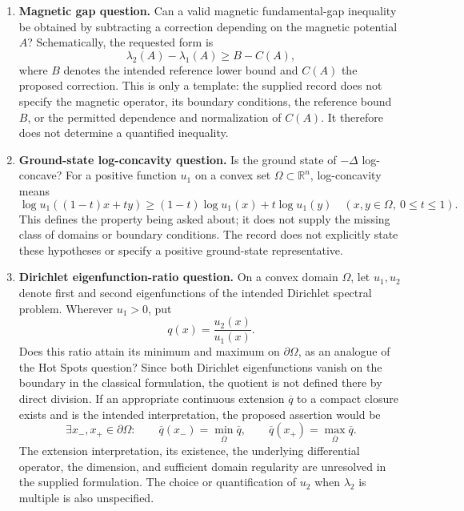 \documentclass[11pt]{article}
\newcommand{\R}{\mathbb{R}}
\begin{document}
\begin{enumerate}
\item \textbf{Magnetic gap question.} Can a valid magnetic fundamental-gap inequality be obtained by subtracting a correction depending on the magnetic potential \(A\)? Schematically, the requested form is
\[
\lambda_2(A)-\lambda_1(A)\geq B-C(A),
\]
where \(B\) denotes the intended reference lower bound and \(C(A)\) the proposed correction. This is only a template: the supplied record does not specify the magnetic operator, its boundary conditions, the reference bound \(B\), or the permitted dependence and normalization of \(C(A)\). It therefore does not determine a quantified inequality.

\item \textbf{Ground-state log-concavity question.} Is the ground state of \(-\Delta\) log-concave? For a positive function \(u_1\) on a convex set \(\Omega\subset\R^n\), log-concavity means
\[
\log u_1((1-t)x+ty)\geq(1-t)\log u_1(x)+t\log u_1(y)
\quad(x,y\in\Omega,\ 0\leq t\leq1).
\]
This defines the property being asked about; it does not supply the missing class of domains or boundary conditions. The record does not explicitly state these hypotheses or specify a positive ground-state representative.

\item \textbf{Dirichlet eigenfunction-ratio question.} On a convex domain \(\Omega\), let \(u_1,u_2\) denote first and second eigenfunctions of the intended Dirichlet spectral problem. Wherever \(u_1>0\), put
\[
q(x)=\frac{u_2(x)}{u_1(x)}.
\]
Does this ratio attain its minimum and maximum on \(\partial\Omega\), as an analogue of the Hot Spots question? Since both Dirichlet eigenfunctions vanish on the boundary in the classical formulation, the quotient is not defined there by direct division. If an appropriate continuous extension \(\overline q\) to a compact closure exists and is the intended interpretation, the proposed assertion would be
\[
\exists x_-,x_+\in\partial\Omega:\qquad
\overline q(x_-)=\min_{\overline\Omega}\overline q,
\qquad
\overline q(x_+)=\max_{\overline\Omega}\overline q.
\]
The extension interpretation, its existence, the underlying differential operator, the dimension, and sufficient domain regularity are unresolved in the supplied formulation. The choice or quantification of \(u_2\) when \(\lambda_2\) is multiple is also unspecified.


\end{enumerate}
\end{document}
